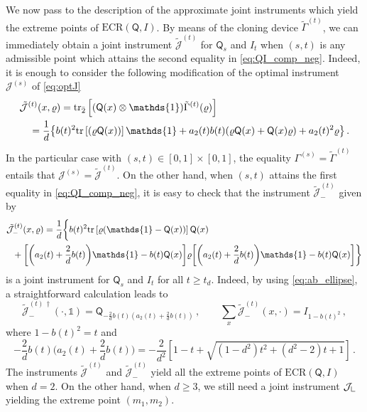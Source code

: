 \documentclass[12pt,reqno]{amsart}
\theoremstyle{definition}
\newcommand{\tr}[1]{{\rm tr}\left[#1\right]} %
\newcommand{\ptr}[2]{{\rm tr}_{#1} #2} %
\newcommand{\id}{\mathds{1}} %
\newcommand{\Qo}{\mathsf{Q}}%
\newcommand{\Lcorner}{{\mathchoice{\mathrel{\makebox[7pt][c]{\rule{.4pt}{7.5pt}\rule{5pt}{.4pt}}}}{\mathrel{\makebox[7pt][c]{\rule{.4pt}{7.5pt}\rule{5pt}{.4pt}}}}{\mathrel{\makebox[5.5pt][c]{\rule{.4pt}{5.25pt}\rule{3.5pt}{.4pt}}}}{\mathrel{\makebox[4pt][c]{\rule{.4pt}{3.75pt}\rule{2.5pt}{.4pt}}}}}}
\newcommand{\rhoo}{\varrho} %
\newcommand{\ii}{\mathcal{J}}
\newcommand{\ECR}[1]{\textrm{ECR} #1} %
\begin{document}
We now pass to the description of the approximate joint instruments which yield the extreme points of $\ECR{(\Qo,I)}$. By means of the cloning device $\tilde{\Gamma}^{(t)}$, we can immediately obtain a joint instrument $\tilde{\ii}^{(t)}$ for $\Qo_s$ and $I_t$ when $(s,t)$ is any admissible point which attains the second equality in \eqref{eq:QI_comp_neg}. Indeed, it is enough to consider the following modification of the optimal instrument $\ii^{(s)}$ of \eqref{eq:optJ}
\begin{equation}\label{eq:tildeJ}
\begin{aligned}
& \tilde{\ii}^{(t)}(x,\rhoo) = \ptr{\bar{2}}{\left[(\Qo(x)\otimes\id)\tilde{\Gamma}^{(t)}(\rhoo)\right]} \\
& \quad = \frac{1}{d} \big\{ b(t)^2 \tr{(\rhoo\Qo(x))} \id + a_2(t)b(t) (\rhoo\Qo(x) + \Qo(x)\rhoo) + a_2(t)^2 \rhoo \big\} \,.
\end{aligned}
\end{equation}
In the particular case with $(s,t)\in [0,1]\times [0,1]$, the equality $\Gamma^{(s)} = \tilde{\Gamma}^{(t)}$ entails that $\ii^{(s)} = \tilde{\ii}^{(t)}$. On the other hand, when $(s,t)$ attains the first equality in \eqref{eq:QI_comp_neg}, it is easy to check that the instrument $\tilde{\ii}^{(t)}_-$ given by
\begin{equation}\label{eq:tildeJminus}
\begin{aligned}
& \tilde{\ii}^{(t)}_-(x,\rhoo) = \frac{1}{d}\bigg\{ b(t)^2 \tr{\rhoo(\id-\Qo(x))}\Qo(x) \\
& \ \ + \bigg[\bigg(a_2(t)+\frac{2}{d}b(t)\bigg)\id-b(t)\Qo(x)\bigg]\rhoo\bigg[\bigg(a_2(t)+\frac{2}{d}b(t)\bigg)\id-b(t)\Qo(x)\bigg]\bigg\}
\end{aligned}
\end{equation}
is a joint instrument for $\Qo_s$ and $I_t$ for all $t\geq t_d$. Indeed, by using \eqref{eq:ab_ellipse}, a straightforward calculation leads to
\begin{equation} %
\tilde{\ii}^{(t)\,\dag}_-(\cdot,\id) = \Qo_{-\frac{2}{d}b(t)\left(a_2(t)+\frac{2}{d}b(t)\right)}\,,\qquad \sum_x \tilde{\ii}^{(t)}_-(x,\cdot) = I_{1-b(t)^2}\,,
\end{equation}
where $1-b(t)^2 = t$ and
\begin{equation*}
-\frac{2}{d}b(t)\bigg(a_2(t)+\frac{2}{d}b(t)\bigg) = -\frac{2}{d^2} \left[ 1 - t + \sqrt{(1 - d^2) t^2 + (d^2 - 2) t + 1}\right]\,.
\end{equation*}
The instruments $\tilde{\ii}^{(t)}$ and $\tilde{\ii}^{(t)}_-$ yield all the extreme points of $\ECR{(\Qo, I)}$ when $d=2$. On the other hand, when $d\geq 3$, we still need a joint instrument $\ii_\Lcorner$ yielding the extreme point $(m_1,m_2)$. %
\end{document}
